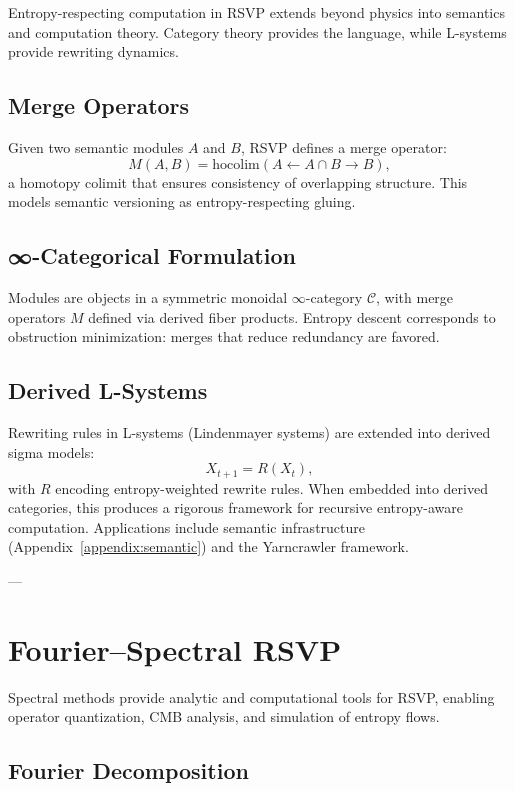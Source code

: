 \documentclass[12pt]{report}
\begin{document}
Entropy-respecting computation in RSVP extends beyond physics into semantics and computation theory. Category theory provides the language, while L-systems provide rewriting dynamics.

\section{Merge Operators}

Given two semantic modules $A$ and $B$, RSVP defines a merge operator:
\begin{equation}
M(A,B) = \mathrm{hocolim}(A \leftarrow A\cap B \to B),
\label{eq:merge}
\end{equation}
a homotopy colimit that ensures consistency of overlapping structure. This models semantic versioning as entropy-respecting gluing.

\section{∞-Categorical Formulation}

Modules are objects in a symmetric monoidal $\infty$-category $\mathcal{C}$, with merge operators $M$ defined via derived fiber products. Entropy descent corresponds to obstruction minimization: merges that reduce redundancy are favored.

\section{Derived L-Systems}

Rewriting rules in L-systems (Lindenmayer systems) are extended into derived sigma models:
\[
X_{t+1} = R(X_t),
\]
with $R$ encoding entropy-weighted rewrite rules. When embedded into derived categories, this produces a rigorous framework for recursive entropy-aware computation.  
Applications include semantic infrastructure (Appendix~\ref{appendix:semantic}) and the Yarncrawler framework.

---

\chapter{Fourier--Spectral RSVP}

Spectral methods provide analytic and computational tools for RSVP, enabling operator quantization, CMB analysis, and simulation of entropy flows.

\section{Fourier Decomposition}
\end{document}
